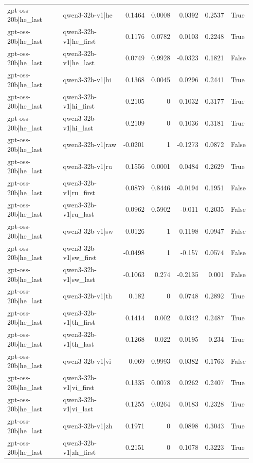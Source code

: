 \begin{table}
\begin{tabular}{l l r r r r l}
gpt-oss-20b|he_last & qwen3-32b-v1|he & 0.1464 & 0.0008 & 0.0392 & 0.2537 & True \\
gpt-oss-20b|he_last & qwen3-32b-v1|he_first & 0.1176 & 0.0782 & 0.0103 & 0.2248 & True \\
gpt-oss-20b|he_last & qwen3-32b-v1|he_last & 0.0749 & 0.9928 & -0.0323 & 0.1821 & False \\
gpt-oss-20b|he_last & qwen3-32b-v1|hi & 0.1368 & 0.0045 & 0.0296 & 0.2441 & True \\
gpt-oss-20b|he_last & qwen3-32b-v1|hi_first & 0.2105 & 0 & 0.1032 & 0.3177 & True \\
gpt-oss-20b|he_last & qwen3-32b-v1|hi_last & 0.2109 & 0 & 0.1036 & 0.3181 & True \\
gpt-oss-20b|he_last & qwen3-32b-v1|raw & -0.0201 & 1 & -0.1273 & 0.0872 & False \\
gpt-oss-20b|he_last & qwen3-32b-v1|ru & 0.1556 & 0.0001 & 0.0484 & 0.2629 & True \\
gpt-oss-20b|he_last & qwen3-32b-v1|ru_first & 0.0879 & 0.8446 & -0.0194 & 0.1951 & False \\
gpt-oss-20b|he_last & qwen3-32b-v1|ru_last & 0.0962 & 0.5902 & -0.011 & 0.2035 & False \\
gpt-oss-20b|he_last & qwen3-32b-v1|sw & -0.0126 & 1 & -0.1198 & 0.0947 & False \\
gpt-oss-20b|he_last & qwen3-32b-v1|sw_first & -0.0498 & 1 & -0.157 & 0.0574 & False \\
gpt-oss-20b|he_last & qwen3-32b-v1|sw_last & -0.1063 & 0.274 & -0.2135 & 0.001 & False \\
gpt-oss-20b|he_last & qwen3-32b-v1|th & 0.182 & 0 & 0.0748 & 0.2892 & True \\
gpt-oss-20b|he_last & qwen3-32b-v1|th_first & 0.1414 & 0.002 & 0.0342 & 0.2487 & True \\
gpt-oss-20b|he_last & qwen3-32b-v1|th_last & 0.1268 & 0.022 & 0.0195 & 0.234 & True \\
gpt-oss-20b|he_last & qwen3-32b-v1|vi & 0.069 & 0.9993 & -0.0382 & 0.1763 & False \\
gpt-oss-20b|he_last & qwen3-32b-v1|vi_first & 0.1335 & 0.0078 & 0.0262 & 0.2407 & True \\
gpt-oss-20b|he_last & qwen3-32b-v1|vi_last & 0.1255 & 0.0264 & 0.0183 & 0.2328 & True \\
gpt-oss-20b|he_last & qwen3-32b-v1|zh & 0.1971 & 0 & 0.0898 & 0.3043 & True \\
gpt-oss-20b|he_last & qwen3-32b-v1|zh_first & 0.2151 & 0 & 0.1078 & 0.3223 & True \\

\end{tabular}
\end{table}
